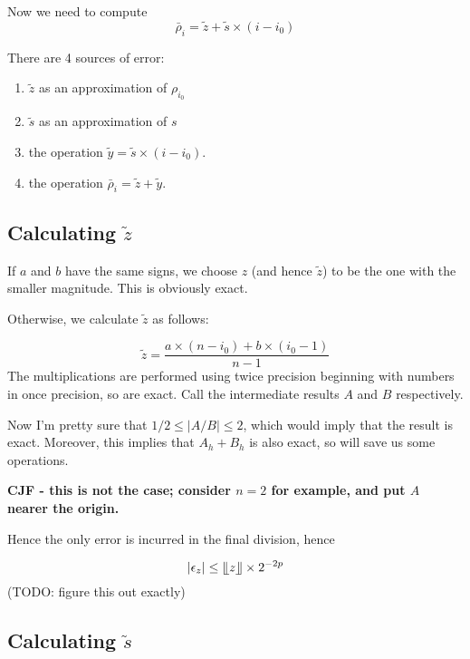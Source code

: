 \documentclass{article}
\newcommand{\binadefloor}[1]{\llfloor #1 \rrfloor}
\begin{document}
Now we need to compute
\begin{equation*}
  \bar\rho_i = \tilde z + \tilde s \times (i - i_0)
\end{equation*}

There are 4 sources of error:
\begin{enumerate}
\item $\tilde z$ as an approximation of $\rho_{i_0}$
\item $\tilde s$ as an approximation of $s$
\item the operation $ \tilde y = \tilde s \times (i-i_0)$.
\item the operation $ \bar\rho_i = \tilde z + \tilde y$.
\end{enumerate}

\subsection{Calculating $\tilde z$}
\label{sec:calculating-tilde-z}

If $a$ and $b$ have the same signs, we choose $z$ (and hence $\tilde z$) to be the one with the smaller magnitude. This is obviously exact.

Otherwise, we calculate $\tilde z$ as follows:

\begin{equation*}
  \tilde z = \frac{a \times (n-i_0) + b \times (i_0 - 1)}{n-1}
\end{equation*}
The multiplications are performed using twice precision beginning with numbers 
in once precision, so are exact. Call the intermediate results $A$ and $B$
respectively.

Now I'm pretty sure that $1/2 \leq |A/B| \leq 2$, which would imply that the 
result is exact.  Moreover, this implies that $A_h + B_h$ is also exact, so
will save us some operations.

\textbf{CJF - this is not the case; consider $n=2$ for example, and put $A$ nearer the origin.}

Hence the only error is incurred in the final division, hence

\begin{equation*}
|\epsilon_z| \leq \binadefloor{z} \times 2^{-2p} 
\end{equation*}
(TODO: figure this out exactly)



\subsection{Calculating $\tilde s$}
\label{sec:calculating-tilde-s}
\end{document}
